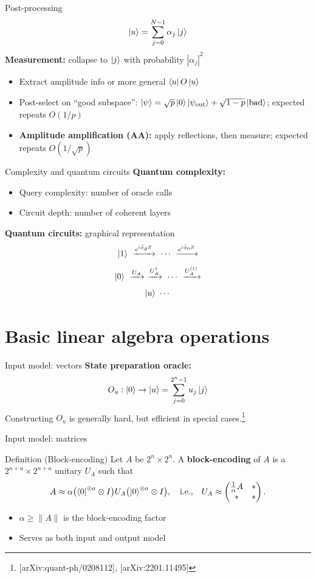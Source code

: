\documentclass[aspectratio=169]{beamer}
\begin{document}
\begin{frame}{Post-processing}
$$\ket{u}=\sum_{j=0}^{N-1}\alpha_j\ket{j}$$
\textbf{Measurement:} collapse to $\ket{j}$ with probability $|\alpha_j|^2$
\begin{itemize}
\item Extract amplitude info or more general $\bra{u}O\ket{u}$
\item Post-select on ``good subspace'':
$\ket{\psi}=\sqrt{p}\ket{0}\ket{\psi_{\mathrm{out}}}+\sqrt{1-p}\ket{\mathrm{bad}}$;
expected repeats $O(1/p)$
\item \textbf{Amplitude amplification (AA):} apply reflections, then measure;
expected repeats $O(1/\sqrt{p})$
\end{itemize}
\end{frame}

\begin{frame}{Complexity and quantum circuits}
\textbf{Quantum complexity:}
\begin{itemize}
\item Query complexity: number of oracle calls
\item Circuit depth: number of coherent layers
\end{itemize}
\textbf{Quantum circuits:} graphical representation
$$\ket{1}\ \xrightarrow{e^{i\tilde\phi_d Z}}\ \cdots\ \xrightarrow{e^{i\tilde\phi_0 Z}}$$
$$\ket{0}\ \xrightarrow{U_A}\ \xrightarrow{U_A^\dagger}\ \cdots\ \xrightarrow{U_A^{(\dagger)}}$$
$$\ket{u}\ \cdots$$
\end{frame}

\section{Basic linear algebra operations}
\begin{frame}\sectionpage\end{frame}

\begin{frame}{Input model: vectors}
\textbf{State preparation oracle:}
$$O_u:\ket{0}\to\ket{u}=\sum_{j=0}^{2^n-1}u_j\ket{j}$$
Constructing $O_u$ is generally hard, but efficient in special cases.\footnote{[arXiv:quant-ph/0208112], [arXiv:2201.11495]}
\end{frame}

\begin{frame}{Input model: matrices}
\begin{block}{Definition (Block-encoding)}
Let $A$ be $2^n\times 2^n$. A \textbf{block-encoding} of $A$ is a $2^{n+a}\times 2^{n+a}$ unitary $U_A$ such that
$$A\approx\alpha\bigl(\bra{0}^{\otimes a}\otimes I\bigr)U_A\bigl(\ket{0}^{\otimes a}\otimes I\bigr),
\quad\text{i.e.,}\quad
U_A\approx\begin{pmatrix}\tfrac{1}{\alpha}A & * \\ * & *\end{pmatrix}.$$
\end{block}
\begin{itemize}
\item $\alpha\ge\|A\|$ is the block-encoding factor
\item Serves as both input and output model
\end{itemize}
\end{frame}
\end{document}
